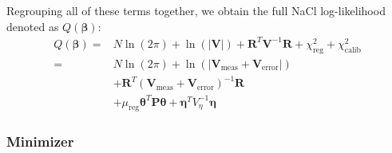 Regrouping all of these terms together, we obtain the full NaCl log-likelihood denoted as $Q(\boldsymbol{\beta})$:
\begin{equation}
    \boxed{
    \begin{aligned}
    Q(\boldsymbol{\beta})
    ={}& N\ln(2\pi) + \ln(|\mathbf{V}|)
    + \mathbf{R}^T\mathbf{V}^{-1}\mathbf{R}
    + \chi^2_{\text{reg}}
    + \chi^2_{\text{calib}} \\[0.5em]
    ={}& N\ln(2\pi)
    + \ln\left(
    \left|\mathbf{V}_{\text{meas}}+\mathbf{V}_{\text{error}}\right|
    \right) \\
    &+ \mathbf{R}^T
    \left(\mathbf{V}_{\text{meas}}+\mathbf{V}_{\text{error}}\right)^{-1}
    \mathbf{R} \\
    &+ \mu_{\text{reg}}\boldsymbol{\theta}^T
    \mathbf{P}\boldsymbol{\theta}
    + \boldsymbol{\eta}^T V_\eta^{-1}\boldsymbol{\eta} 
    \end{aligned}
    }
    \end{equation}

\subsubsection{Minimizer}
 
